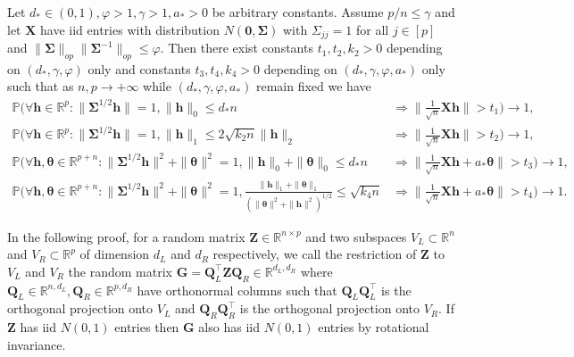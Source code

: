 \documentclass[11pt]{amsart}
\numberwithin{equation}{section}
\numberwithin{equation}{section}
\def\real{{\mathbb{R}}}
\def\R{{\real}}
\def\P{{\mathbb{P}}}
\def\mathbold{\boldsymbol} %
\def\bG{\mathbold{G}}\def\calG{{\cal G}}\def\scrG{{\mathscr G}}\def\Ghat{\widehat{G}}\def\Gtil{{\widetilde G}}
\def\bh{\mathbold{h}}\def\hhat{\widehat{h}}\def\htil{\widetilde{h}}
\def\bQ{\mathbold{Q}}\def\hbQ{{\widehat{\bQ}}}\def\tbQ{{\widetilde{\bQ}}}
\def\bX{\mathbold{X}}\def\hbX{{\widehat{\bX}}}\def\tbX{{\widetilde{\bX}}}\def\bXbar{{\overline \bX}}
\def\bZ{\mathbold{Z}}\def\hbZ{{\widehat{\bZ}}}\def\tbZ{{\widetilde{\bZ}}}
\def\btheta{\mathbold{\theta}}\def\thetahat{\widehat{\theta}}\def\htheta{\widehat{\theta}}
\def\bSigma{\mathbold{\Sigma}}\def\hbSigma{{\widehat{\bSigma}}}
\def\calG{{\cal G}}
\begin{document}
\begin{lemma}
    Let $d_*\in(0,1),\varphi>1,\gamma>1,a_*>0$ be arbitrary constants.
    Assume $p/n\le \gamma$ and
    let $\bX$ have iid entries with distribution $N(\mathbf 0,\bSigma)$
    with $\Sigma_{jj}=1$ for all $j\in[p]$ and
    $\|\bSigma\|_{op}\|\bSigma^{-1}\|_{op}\le \varphi$.
    Then there exist constants $t_1,t_2,k_2>0$ depending on $(d_*,\gamma,\varphi)$
    only and constants
    $t_3,t_4,k_4>0$ depending on $(d_*,\gamma,\varphi,a_*)$ only such that
    as $n,p\to+\infty$ while $(d_*,\gamma,\varphi,a_*)$ remain fixed we have
    \begin{align}
    \label{RIP_lasso}
    \P(\forall \bh\in\R^p:
    \|\bSigma^{1/2}\bh\|=1,
    \|\bh\|_0\le d_*n 
    &\Rightarrow \|\tfrac{1}{\sqrt n}\bX\bh\|> t_1
    ) \to 1,
    \\
    \label{RE_lasso}
    \P(\forall \bh\in\R^p:
    \|\bSigma^{1/2}\bh\|=1,
    \|\bh\|_1\le 2 \sqrt{k_2n}\|\bh\|_2
    &\Rightarrow \|\tfrac{1}{\sqrt n}\bX\bh\| > t_2
    ) \to 1,
    \\\P(\forall \bh,\btheta\in\R^{p+n}:
    \|\bSigma^{1/2}\bh\|^2 + \|\btheta\|^2=1,
    \|\bh\|_0+\|\btheta\|_0\le d_*n 
    &\Rightarrow \|\tfrac{1}{\sqrt n}\bX\bh + a_*\btheta\| > t_3
    ) \to 1,
    \label{RIP_huber}
    \\\P(\forall \bh,\btheta\in\R^{p+n}:
    \|\bSigma^{1/2}\bh\|^2 + \|\btheta\|^2=1,
    \tfrac{ \|\bh\|_1+\|\btheta\|_1}{(\|\btheta\|^2+\|\bh\|^2)^{1/2}}\le \sqrt{k_4n} 
    &\Rightarrow \|\tfrac{1}{\sqrt n}\bX\bh + a_* \btheta\| > t_4
    ) \to 1.
    \label{RE_huber}
    \end{align}
\end{lemma}
In the following proof, for a random matrix $\bZ\in\R^{n\times p}$
and two subspaces $V_L\subset \R^n$ and $V_R\subset\R^p$
of dimension $d_L$ and $d_R$ respectively,
we call the restriction
of $\bZ$ to $V_L$ and $V_R$ the random matrix $\bG=\bQ_L^\top\bZ\bQ_R\in\R^{d_L,d_R}$
where $\bQ_L\in\R^{n,d_L},\bQ_R\in\R^{p,d_R}$
have orthonormal columns such that $\bQ_L\bQ_L^\top$ is the orthogonal projection
onto $V_L$ and $\bQ_R\bQ_R^\top$ is the orthogonal projection onto $V_R$.
If $\bZ$ has iid $N(0,1)$ entries then $\bG$ also has iid $N(0,1)$ entries
by rotational invariance.
\end{document}
